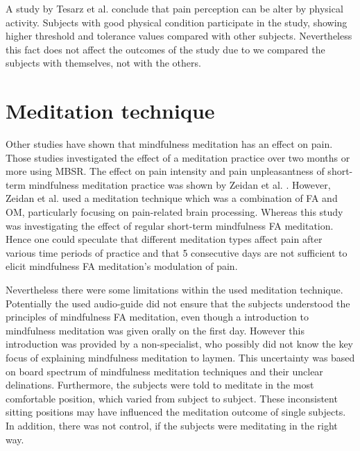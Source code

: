 A study by Tesarz et al. \cite{Tesarz2012} conclude that pain perception can be alter by physical activity. Subjects with good physical condition participate in the study, showing higher threshold and tolerance values compared with other subjects. Nevertheless this fact does not affect the outcomes of the study due to we compared the subjects with themselves, not with the others.

\section{Meditation technique}
Other studies have shown that mindfulness meditation has an effect on pain. Those studies investigated the effect of a meditation practice over two months or more using MBSR. \cite{Kabat1982,Rosenzweig2010} The effect on pain intensity and pain unpleasantness of short-term mindfulness meditation practice was shown by Zeidan et al. \cite{Zeidan2012}. However, Zeidan et al. \cite{Zeidan2012} used a meditation technique which was a combination of FA and OM, particularly focusing on pain-related brain processing. Whereas this study was investigating the effect of regular short-term mindfulness FA meditation. Hence one could speculate that different meditation types affect pain after various time periods of practice and that 5 consecutive days are not sufficient to elicit mindfulness FA meditation’s modulation of pain.

Nevertheless there were some limitations within the used meditation technique. Potentially the used audio-guide did not ensure that the subjects understood the principles of mindfulness FA meditation, even though a introduction to mindfulness meditation was given orally on the first day. However this introduction was provided by a non-specialist, who possibly did not know the key focus of explaining mindfulness meditation to laymen. This uncertainty was based on board spectrum of mindfulness meditation techniques and their unclear delinations. 
Furthermore, the subjects were told to meditate in the most comfortable position, which varied from subject to subject. These inconsistent sitting positions may have influenced the meditation outcome of single subjects. In addition, there was not control, if the subjects were meditating in the right way.

